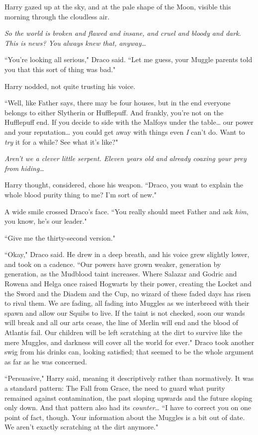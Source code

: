 Harry gazed up at the sky, and at the pale shape of the Moon, visible this morning through the cloudless air.

\emph{So the world is broken and flawed and insane, and cruel and bloody and dark. This is news? You always knew that, anyway{\ldots}}

``You're looking all serious," Draco said. ``Let me guess, your Muggle parents told you that this sort of thing was bad."

Harry nodded, not quite trusting his voice.

``Well, like Father says, there may be four houses, but in the end everyone belongs to either Slytherin or Hufflepuff. And frankly, you're not on the Hufflepuff end. If you decide to side with the Malfoys under the table{\ldots} our power and your reputation{\ldots} you could get away with things even \emph{I} can't do. Want to \emph{try} it for a while? See what it's like?"

\emph{Aren't we a clever little serpent. Eleven years old and already coaxing your prey from hiding{\ldots}}

Harry thought, considered, chose his weapon. ``Draco, you want to explain the whole blood purity thing to me? I'm sort of new."

A wide smile crossed Draco's face. ``You really should meet Father and ask \emph{him}, you know, he's our leader."

``Give me the thirty-second version."

``Okay," Draco said. He drew in a deep breath, and his voice grew slightly lower, and took on a cadence. ``Our powers have grown weaker, generation by generation, as the Mudblood taint increases. Where Salazar and Godric and Rowena and Helga once raised Hogwarts by their power, creating the Locket and the Sword and the Diadem and the Cup, no wizard of these faded days has risen to rival them. We are fading, all fading into Muggles as we interbreed with their spawn and allow our Squibs to live. If the taint is not checked, soon our wands will break and all our arts cease, the line of Merlin will end and the blood of Atlantis fail. Our children will be left scratching at the dirt to survive like the mere Muggles, and darkness will cover all the world for ever." Draco took another swig from his drinks can, looking satisfied; that seemed to be the whole argument as far as he was concerned.

``Persuasive," Harry said, meaning it descriptively rather than normatively. It was a standard pattern: The Fall from Grace, the need to guard what purity remained against contamination, the past sloping upwards and the future sloping only down. And that pattern also had its \emph{counter}{\ldots} ``I have to correct you on one point of fact, though. Your information about the Muggles is a bit out of date. We aren't exactly scratching at the dirt anymore."

